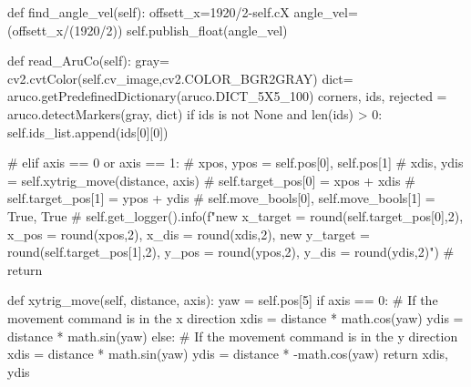     def find_angle_vel(self):
        offsett_x=1920/2-self.cX
        angle_vel=(offsett_x/(1920/2))
        self.publish_float(angle_vel)

    
    def read_AruCo(self):
        gray= cv2.cvtColor(self.cv_image,cv2.COLOR_BGR2GRAY)
        dict= aruco.getPredefinedDictionary(aruco.DICT_5X5_100)
        corners, ids, rejected = aruco.detectMarkers(gray, dict)
        if ids is not None and len(ids) > 0:
           self.ids_list.append(ids[0][0])


           # elif axis == 0 or axis == 1:
           #     xpos, ypos = self.pos[0], self.pos[1] 
           #     xdis, ydis = self.xytrig_move(distance, axis) 
           #     self.target_pos[0] = xpos + xdis
           #     self.target_pos[1] = ypos + ydis 
           #     self.move_bools[0], self.move_bools[1] = True, True
           #     self.get_logger().info(f"new x_target = {round(self.target_pos[0],2)}, x_pos = {round(xpos,2)}, x_dis = {round(xdis,2)}, new y_target = {round(self.target_pos[1],2)}, y_pos = {round(ypos,2)}, y_dis = {round(ydis,2)}")
           #     return

           def xytrig_move(self, distance, axis):
           yaw = self.pos[5]
           if axis == 0:  # If the movement command is in the x direction
               xdis = distance * math.cos(yaw)
               ydis = distance * math.sin(yaw)
           else:  # If the movement command is in the y direction
               xdis = distance * math.sin(yaw)
               ydis = distance * -math.cos(yaw)
           return xdis, ydis